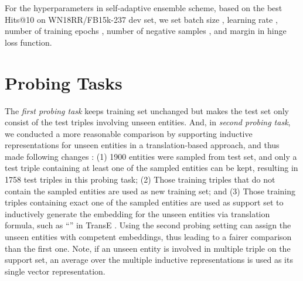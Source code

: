 \documentclass[sigconf]{acmart}
\begin{document}
For the hyperparameters in self-adaptive ensemble scheme, based on the best Hits@10 on WN18RR/FB15k-237 dev set, we set batch size , learning rate , number of training epochs , number of negative samples , and margin  in hinge loss function.

\section{Probing Tasks} \label{app:two_probing}

The \emph{first probing task} keeps training set unchanged but makes the test set only consist of the test triples involving unseen entities. And, in \emph{second probing task}, we conducted a more reasonable comparison by supporting inductive representations \citep{hamilton2017inductive} for unseen entities in a translation-based approach, and thus made following changes : (1) 1900 entities were sampled from test set, and only a test triple containing at least one of the sampled entities can be kept, resulting in 1758 test triples in this probing task; (2) Those training triples that do not contain the sampled entities are used as new training set; and (3) Those training triples containing exact one of the sampled entities are used as support set to inductively generate the embedding for the unseen entities via translation formula, such as ``'' in TransE \citep{TransE}. 
Using the second probing setting can assign the unseen entities with competent embeddings, thus leading to a fairer comparison than the first one. 
Note, if an unseen entity is involved in multiple triple on the support set, an average over the multiple inductive representations is used as its single vector representation.
\end{document}
